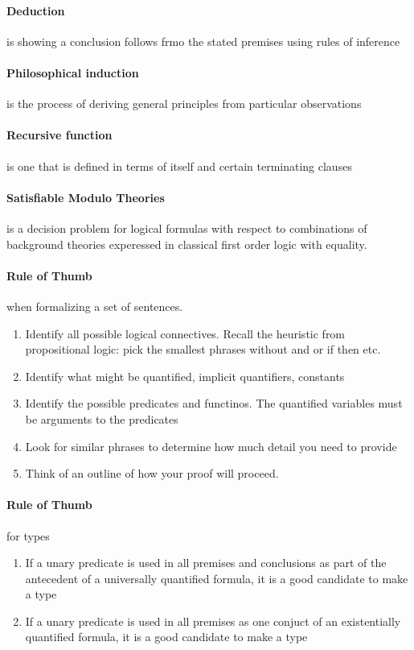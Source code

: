     \paragraph{Deduction} is showing a conclusion follows frmo the stated
    premises using rules of inference

    \paragraph{Philosophical induction} is the process of deriving general
    principles from particular observations

    \paragraph{Recursive function} is one that is defined in terms of itself
    and certain terminating clauses

    \paragraph{Satisfiable Modulo Theories}
      is a decision problem for logical formulas with respect to combinations
      of background theories experessed in classical first order logic with
      equality.

    \paragraph{Rule of Thumb} when formalizing a set of sentences.
    \begin{enumerate}
      \item Identify all possible logical connectives. Recall the heuristic
        from propositional logic: pick the smallest phrases without and or if
        then etc.
      \item Identify what might be quantified, implicit quantifiers, constants
      \item Identify the possible predicates and functinos. The quantified
        variables must be arguments to the predicates
      \item Look for similar phrases to determine how much detail you need to
        provide
      \item Think of an outline of how your proof will proceed.
    \end{enumerate}

    \paragraph{Rule of Thumb} for types
    \begin{enumerate}
      \item If a unary predicate is used in all premises and conclusions as
        part of the antecedent of a universally quantified formula, it is a
        good candidate to make a type
      \item If a unary predicate is used in all premises as one conjuct of an
        existentially quantified formula, it is a good candidate to make a type
    \end{enumerate}
